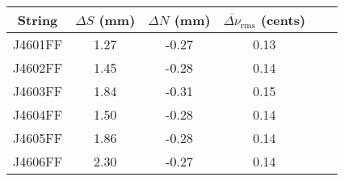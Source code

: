 \begin{tabular}{cccccc}
\toprule
String & $\Delta S$ (mm) & $\Delta N$ (mm) & $\overline{\Delta \nu}_\text{rms}$ (cents) \\
\midrule
J4601FF & 1.27 & -0.27 & 0.13 \\
J4602FF & 1.45 & -0.28 & 0.14 \\
J4603FF & 1.84 & -0.31 & 0.15 \\
J4604FF & 1.50 & -0.28 & 0.14 \\
J4605FF & 1.86 & -0.28 & 0.14 \\
J4606FF & 2.30 & -0.27 & 0.14 \\
\bottomrule
\end{tabular}


